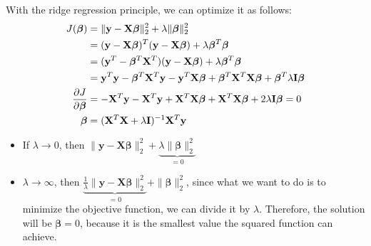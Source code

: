 With the ridge regression principle, we can optimize it as follows:
\begin{align}
	J(\boldsymbol{\beta}) &= \|\mathbf{y}-\mathbf{X}\boldsymbol{\beta}\|^2_2 + \lambda \|\boldsymbol{\beta}\|^2_2 \\
			&= (\mathbf{y}-\mathbf{X}\boldsymbol{\beta})^T(\mathbf{y}-\mathbf{X}\boldsymbol{\beta})+\lambda\boldsymbol{\beta}^T\boldsymbol{\beta}\\
			&= (\mathbf{y}^T-\boldsymbol{\beta}^T\mathbf{X}^T)(\mathbf{y}-\mathbf{X}\boldsymbol{\beta})+\lambda\boldsymbol{\beta}^T\boldsymbol{\beta}\\
			&= {\mathbf{y}}^T{\mathbf{y}}-\boldsymbol{\beta}^T\mathbf{X}^T{\mathbf{y}}-{\mathbf{y}}^T\mathbf{X}\boldsymbol{\beta}+\boldsymbol{\beta}^T\mathbf{X}^T\mathbf{X}\boldsymbol{\beta}+\boldsymbol{\beta}^T\lambda\mathbf{I}\boldsymbol{\beta}\\
	\frac{\partial J}{\partial \boldsymbol{\beta}}&= -\mathbf{X}^T{\mathbf{y}}-\mathbf{X}^T{\mathbf{y}}+\mathbf{X}^T\mathbf{X}\boldsymbol{\beta}+\mathbf{X}^T\mathbf{X}\boldsymbol{\beta}+2\lambda\mathbf{I}\boldsymbol{\beta} = 0\\
	\boldsymbol{\beta}	&= (\mathbf{X}^T\mathbf{X}+\lambda\mathbf{I})^{-1}\mathbf{X}^T{\mathbf{y}}
	\label{eq:ridge_regression}
\end{align}

\begin{itemize}
	\item If $\lambda\to 0$, then $\|\mathbf{y}-\mathbf{X}\boldsymbol{\beta}\|^2_2 + \underbrace{\lambda \|\boldsymbol{\beta}\|^2_2}_{=0}$ 
	\item $\lambda\to \infty$, then $\underbrace{\frac{1}{\lambda}\|\mathbf{y}-\mathbf{X}\boldsymbol{\beta}\|^2_2}_{=0} + \|\boldsymbol{\beta}\|^2_2$, since what we want to do is to minimize the objective function, we can divide it by $\lambda$. Therefore, the solution will be $\boldsymbol{\beta}=0$, because it is the smallest value the squared function can achieve. 
\end{itemize}

